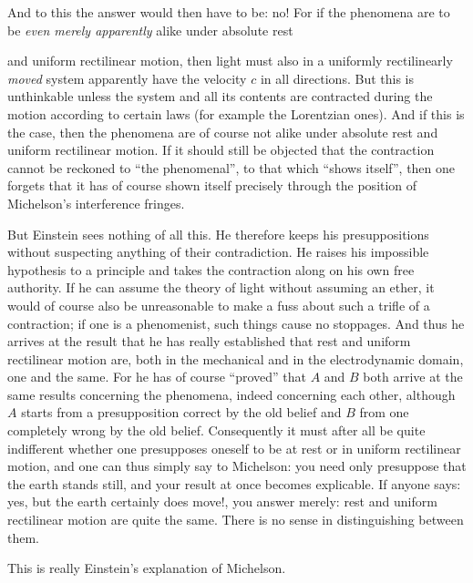 \documentclass[12pt,a4paper]{article}
\begin{document}
And to this the answer would then have to be: no! For if the phenomena are to
be \emph{even merely apparently} alike under absolute rest

and uniform rectilinear motion, then light must also in a uniformly
rectilinearly \emph{moved} system apparently have the velocity $c$ in all
directions. But this is unthinkable unless the system and all its contents are
contracted during the motion according to certain laws (for example the
Lorentzian ones). And if this is the case, then the phenomena are of course
not alike under absolute rest and uniform rectilinear motion. If it should
still be objected that the contraction cannot be reckoned to ``the
phenomenal'', to that which ``shows itself'', then one forgets that it has of
course shown itself precisely through the position of Michelson's interference
fringes.

But Einstein sees nothing of all this. He therefore keeps his presuppositions
without suspecting anything of their contradiction. He raises his impossible
hypothesis to a principle and takes the contraction along on his own free
authority. If he can assume the theory of light without assuming an ether, it
would of course also be unreasonable to make a fuss about such a trifle of a
contraction; if one is a phenomenist, such things cause no stoppages. And thus
he arrives at the result that he has really established that rest and uniform
rectilinear motion are, both in the mechanical and in the electrodynamic
domain, one and the same. For he has of course ``proved'' that $A$ and $B$
both arrive at the same results concerning the phenomena, indeed concerning
each other, although $A$ starts from a presupposition correct by the old
belief and $B$ from one completely wrong by the old belief. Consequently it
must after all be quite indifferent whether one presupposes oneself to be at
rest or in uniform rectilinear motion, and one can thus simply say to
Michelson: you need only presuppose that the earth stands still, and your
result at once becomes explicable. If anyone says: yes, but the earth
certainly does move!, you answer merely: rest and uniform rectilinear motion
are quite the same. There is no sense in distinguishing between them.

This is really Einstein's explanation of Michelson.
\end{document}
